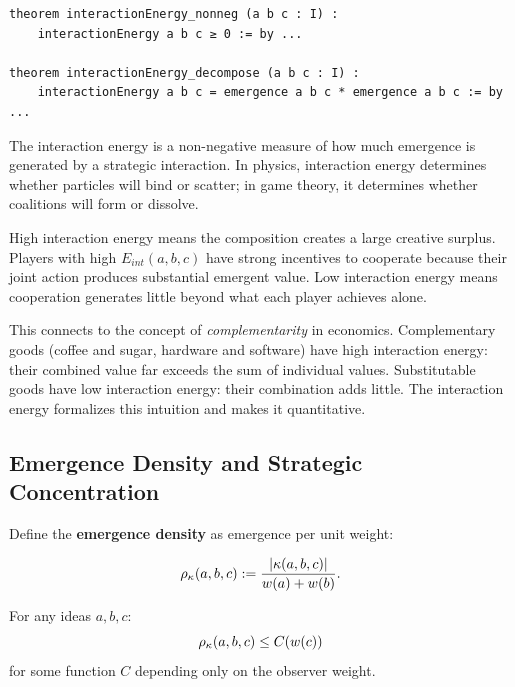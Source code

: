 \begin{lstlisting}[caption={Interaction energy (IDT\_v3\_Emergence.lean)}]
theorem interactionEnergy_nonneg (a b c : I) :
    interactionEnergy a b c ≥ 0 := by ...

theorem interactionEnergy_decompose (a b c : I) :
    interactionEnergy a b c = emergence a b c * emergence a b c := by ...
\end{lstlisting}

\begin{interpretation}
The interaction energy is a non-negative measure of how much emergence is
generated by a strategic interaction. In physics, interaction energy determines
whether particles will bind or scatter; in game theory, it determines whether
coalitions will form or dissolve.

High interaction energy means the composition creates a large creative surplus.
Players with high $E_{int}(a,b,c)$ have strong incentives to cooperate because
their joint action produces substantial emergent value. Low interaction energy
means cooperation generates little beyond what each player achieves alone.

This connects to the concept of \emph{complementarity} in economics. Complementary
goods (coffee and sugar, hardware and software) have high interaction energy:
their combined value far exceeds the sum of individual values. Substitutable
goods have low interaction energy: their combination adds little. The interaction
energy formalizes this intuition and makes it quantitative.
\end{interpretation}

\subsection{Emergence Density and Strategic Concentration}

Define the \textbf{emergence density} as emergence per unit weight:

\begin{definition}
\label{def:emergence-density}
\[
  \rho_{\kappa}(a,b,c) := \frac{|\kappa(a,b,c)|}{w(a) + w(b)}.
\]
\end{definition}

\begin{theorem}
\label{thm:emergence-density-bound}
For any ideas $a, b, c$:
\[
  \rho_{\kappa}(a,b,c) \leq C(w(c))
\]
for some function $C$ depending only on the observer weight.
\end{theorem}


